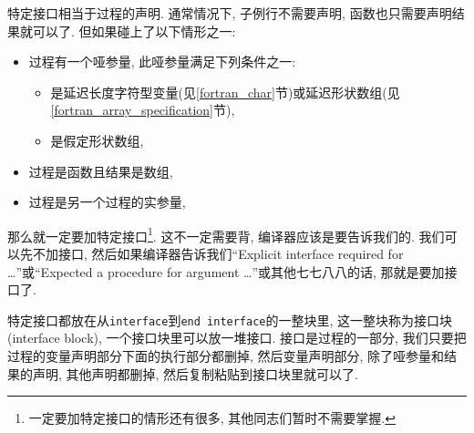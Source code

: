 特定接口相当于过程的声明. 通常情况下, 子例行不需要声明, 函数也只需要声明结果就可以了. 但如果碰上了以下情形之一:
\begin{itemize}
    \item 过程有一个哑参量, 此哑参量满足下列条件之一:\begin{itemize}
        \item 是延迟长度字符型变量(见\ref{fortran_char}节)或延迟形状数组(见\ref{fortran_array_specification}节),
        \item 是假定形状数组,
    \end{itemize}
    \item 过程是函数且结果是数组,
    \item 过程是另一个过程的实参量,
\end{itemize}
那么就一定要加特定接口\footnote{一定要加特定接口的情形还有很多, 其他同志们暂时不需要掌握.}. 这不一定需要背, 编译器应该是要告诉我们的. 我们可以先不加接口, 然后如果编译器告诉我们``Explicit interface required for \dots''或``Expected a procedure for argument \dots''或其他七七八八的话, 那就是要加接口了.

特定接口都放在从\texttt{interface}到\texttt{end interface}的一整块里, 这一整块称为接口块(interface block), 一个接口块里可以放一堆接口. 接口是过程的一部分, 我们只要把过程的变量声明部分下面的执行部分都删掉, 然后变量声明部分, 除了哑参量和结果的声明, 其他声明都删掉, 然后复制粘贴到接口块里就可以了.

